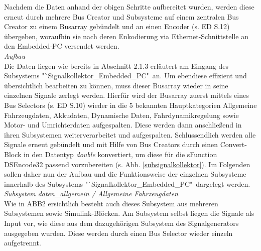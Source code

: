 \documentclass[fontsize = 12pt, paper = a4]{scrreprt}
\begin{document}
Nachdem die Daten anhand der obigen Schritte aufbereitet wurden, werden diese erneut durch mehrere Bus Creator und Subsysteme auf einem zentralen Bus Creator zu einem Busarray gebündelt und  an einen Encoder (s. ED S.12) übergeben, woraufhin sie nach deren Enkodierung via Ethernet-Schnittstelle an den Embedded-PC versendet werden. \\


\textit{Aufbau} \\

Die Daten liegen wie bereits in Abschnitt 2.1.3 erläutert am Eingang des Subsystems "`Signalkollektor\_Embedded\_PC"\ an. Um ebendiese effizient und übersichtlich bearbeiten zu können, muss dieser Busarray wieder in seine einzelnen Signale zerlegt werden. Hierfür wird der Busarray zuerst mittels eines Bus Selectors (s. ED S.10) wieder in die 5 bekannten Hauptkategorien Allgemeine Fahrzeugdaten, Akkudaten, Dynamische Daten, Fahrdynamikregelung sowie Motor- und Umrichterdaten aufgespalten. Diese werden dann anschließend in ihren Subsystemen weiterverarbeitet und aufgespalten. Schlussendlich werden alle Signale erneut gebündelt und mit Hilfe von Bus Creators durch einen Convert-Block in den Datentyp \textit{double} konvertiert, um diese für die sFunction DSEncode32 passend vorzubereiten (s. Abb. \ref{subsignalkollektor}). Im Folgenden sollen daher nun der Aufbau und die Funktionsweise der einzelnen Subsysteme innerhalb des Subsystems "`Signalkollektor\_Embedded\_PC"\ dargelegt werden. \\


\textit{Subsystem daten\_allgemein / Allgemeine Fahrzeugdaten} \\

Wie in ABB2 ersichtlich besteht auch dieses Subsystem aus mehreren Subsystemen sowie Simulink-Blöcken. Am Subsystem selbst liegen die Signale als Input vor, wie diese aus dem dazugehörigen Subsystem des Signalgenerators ausgegeben wurden. Diese werden durch einen Bus Selector wieder einzeln aufgetrennt.

\newpage
\end{document}
